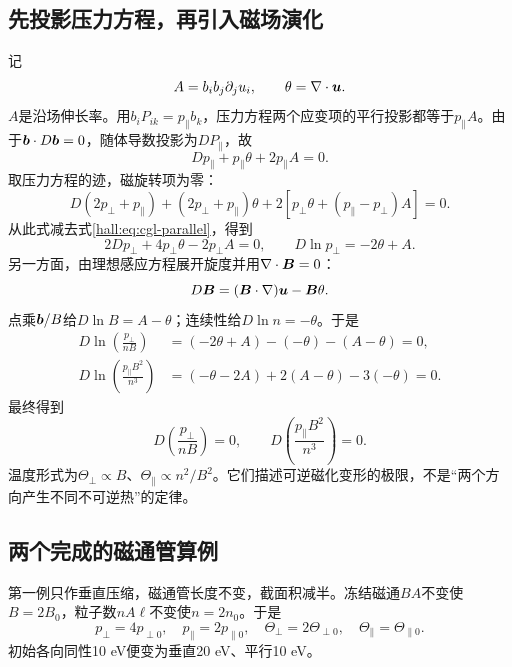 \subsection{先投影压力方程，再引入磁场演化}
记
\begin{equation}
A=b_ib_j\partial_ju_i,\qquad\theta=\nabla\cdot\bm{u}.
\end{equation}
$A$是沿场伸长率。用$b_iP_{ik}=p_\parallel b_k$，压力方程两个应变项的平行投影都等于$p_\parallel A$。由于$\bm{b}\cdot D\bm{b}=0$，随体导数投影为$DP_\parallel$，故
\begin{equation}
Dp_\parallel+p_\parallel\theta+2p_\parallel A=0.
\label{hall:eq:cgl-parallel}
\end{equation}
取压力方程的迹，磁旋转项为零：
\begin{equation}
D(2p_\perp+p_\parallel)+(2p_\perp+p_\parallel)\theta
+2[p_\perp\theta+(p_\parallel-p_\perp)A]=0.
\end{equation}
从此式减去式\eqref{hall:eq:cgl-parallel}，得到
\begin{equation}
2Dp_\perp+4p_\perp\theta-2p_\perp A=0,
\qquad D\ln p_\perp=-2\theta+A.
\end{equation}
另一方面，由理想感应方程展开旋度并用$\nabla\cdot\bm{B}=0$：
\begin{equation}
D\bm{B}=(\bm{B}\cdot\nabla)\bm{u}-\bm{B}\theta.
\end{equation}
点乘$\bm{b}/B$给$D\ln B=A-\theta$；连续性给$D\ln n=-\theta$。于是
\begin{align}
D\ln\left(\frac{p_\perp}{nB}\right)
&=(-2\theta+A)-(-\theta)-(A-\theta)=0,\\
D\ln\left(\frac{p_\parallel B^2}{n^3}\right)
&=(-\theta-2A)+2(A-\theta)-3(-\theta)=0.
\end{align}
最终得到
\begin{equation}
\boxed{D\left(\frac{p_\perp}{nB}\right)=0,\qquad
D\left(\frac{p_\parallel B^2}{n^3}\right)=0.}
\label{hall:eq:cgl-invariants}
\end{equation}
温度形式为$\Theta_\perp\propto B$、$\Theta_\parallel\propto n^2/B^2$。它们描述可逆磁化变形的极限，不是“两个方向产生不同不可逆热”的定律。

\subsection{两个完成的磁通管算例}
第一例只作垂直压缩，磁通管长度不变，截面积减半。冻结磁通$BA$不变使$B=2B_0$，粒子数$nA\ell$不变使$n=2n_0$。于是
\begin{equation}
p_\perp=4p_{\perp0},\quad p_\parallel=2p_{\parallel0},\quad
\Theta_\perp=2\Theta_{\perp0},\quad\Theta_\parallel=\Theta_{\parallel0}.
\end{equation}
初始各向同性10 eV便变为垂直20 eV、平行10 eV。

